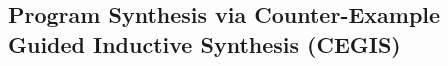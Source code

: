 \documentclass[format=acmsmall, review=false, screen=true]{acmart}
\begin{document}

\subsection{Program Synthesis via Counter-Example \\ Guided Inductive Synthesis (CEGIS)}
\end{document}
